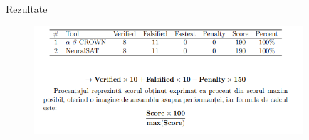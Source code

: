 \begin{frame}{Rezultate}
    \begin{figure}[ht]
    \centering
    {\includegraphics[width=10cm]{images/interpretare/formula.png}}
    \label{tabelTotal}
    \end{figure}
\end{frame}







































